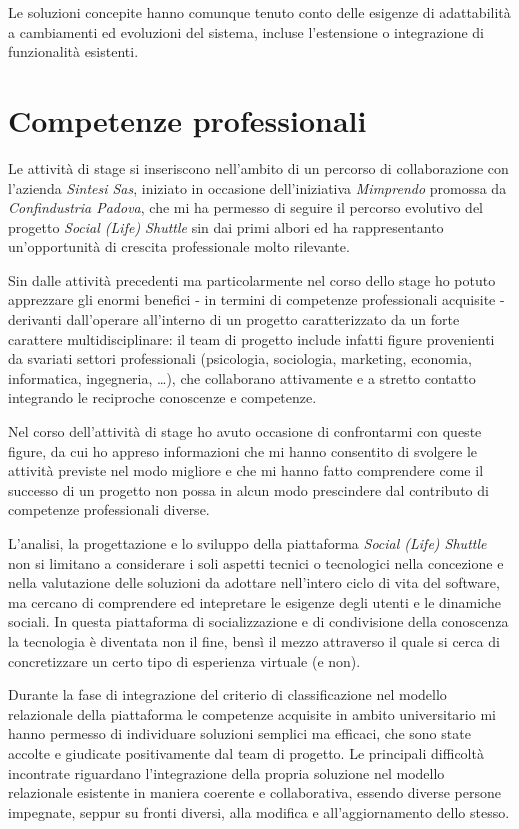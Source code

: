 Le soluzioni concepite hanno comunque tenuto conto delle esigenze di adattabilità a cambiamenti ed evoluzioni del sistema, incluse l'estensione o integrazione di funzionalità esistenti.

\section{Competenze professionali}
Le attività di stage si inseriscono nell'ambito di un percorso di collaborazione con l'azienda \textit{Sintesi Sas}, iniziato in occasione dell'iniziativa \textit{Mimprendo} promossa da \textit{Confindustria Padova}, che mi ha permesso di seguire il percorso evolutivo del progetto \textit{Social (Life) Shuttle} sin dai primi albori ed ha rappresentanto un'opportunità di crescita professionale molto rilevante.

Sin dalle attività precedenti ma particolarmente nel corso dello stage ho potuto apprezzare gli enormi benefici - in termini di competenze professionali acquisite - derivanti dall'operare all'interno di un progetto caratterizzato da un forte carattere multidisciplinare: il team di progetto include infatti figure provenienti da svariati settori professionali (psicologia, sociologia, marketing, economia, informatica, ingegneria, \ldots), che collaborano attivamente e a stretto contatto integrando le reciproche conoscenze e competenze.

Nel corso dell'attività di stage ho avuto occasione di confrontarmi con queste figure, da cui ho appreso informazioni che mi hanno consentito di svolgere le attività previste nel modo migliore e che mi hanno fatto comprendere come il successo di un progetto non possa in alcun modo prescindere dal contributo di competenze professionali diverse.

L'analisi, la progettazione e lo sviluppo della piattaforma \textit{Social (Life) Shuttle} non si limitano a considerare i soli aspetti tecnici o tecnologici nella concezione e nella valutazione delle soluzioni da adottare nell'intero ciclo di vita del software, ma cercano di comprendere ed intepretare le esigenze degli utenti e le dinamiche sociali. In questa piattaforma di socializzazione e di condivisione della conoscenza la tecnologia è diventata non il fine, bensì il mezzo attraverso il quale si cerca di concretizzare un certo tipo di esperienza virtuale (e non).

Durante la fase di integrazione del criterio di classificazione nel modello relazionale della piattaforma le competenze acquisite in ambito universitario mi hanno permesso di individuare soluzioni semplici ma efficaci, che sono state accolte e giudicate positivamente dal team di progetto. Le principali difficoltà incontrate riguardano l'integrazione della propria soluzione nel modello relazionale esistente in maniera coerente e collaborativa, essendo diverse persone impegnate, seppur su fronti diversi, alla modifica e all'aggiornamento dello stesso.


